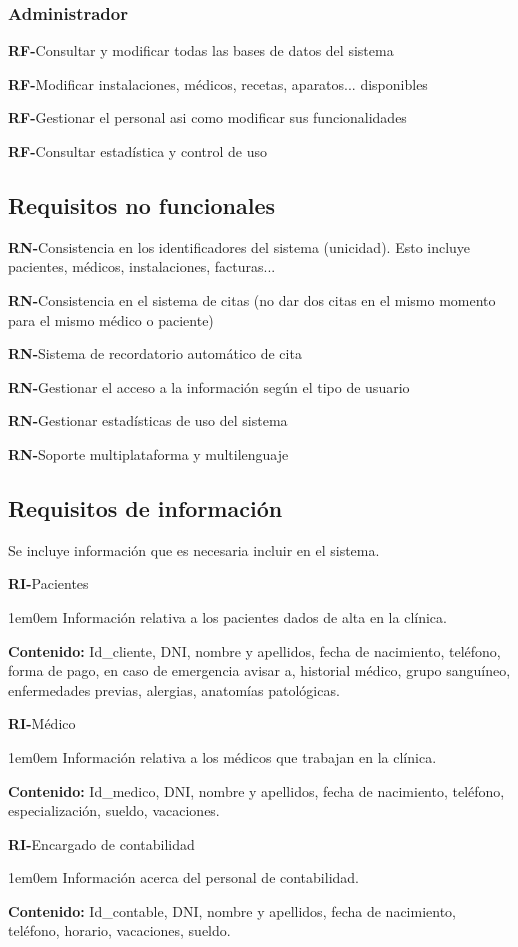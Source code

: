 \documentclass[12pt,a4paper]{article}
\newcounter{RFCounter}
\newcommand{\rf}[1]{\addtocounter{RFCounter}{1}\textbf{\rmfamily RF-\theRFCounter}\quad#1\\}
\newcounter{RNCounter}
\newcommand{\rn}[1]{\addtocounter{RNCounter}{1}\textbf{\rmfamily RN-\theRNCounter}\quad#1\\}
\newcounter{RICounter}
\newenvironment{rienv}[1]
	{\addtocounter{RICounter}{1}\textbf{\rmfamily RI-\theRICounter}\quad#1\begin{adjustwidth}{1em}{0em}}
	{\end{adjustwidth}}
\begin{document}
\subsubsection{Administrador}
    \rf{Consultar y modificar todas las bases de datos del sistema}
    \rf{Modificar instalaciones, médicos, recetas, aparatos... disponibles}
    \rf{Gestionar el personal asi como modificar sus funcionalidades}
    \rf{Consultar estadística y control de uso}

\subsection{Requisitos no funcionales}
  \rn{Consistencia en los identificadores del sistema (unicidad). Esto incluye pacientes, médicos, instalaciones, facturas...}
  \rn{Consistencia en el sistema de citas (no dar dos citas en el mismo momento para el mismo médico o paciente)}
  \rn{Sistema de recordatorio automático de cita}
  \rn{Gestionar el acceso a la información según el tipo de usuario}
  \rn{Gestionar estadísticas de uso del sistema}
  \rn{Soporte multiplataforma y multilenguaje}


\subsection{Requisitos de información}

Se incluye información que es necesaria incluir en el sistema.

\begin{rienv}{Pacientes}
  Información relativa a los pacientes dados de alta en la clínica.

  \textbf{Contenido:} Id\_cliente, DNI, nombre y apellidos, fecha de nacimiento, teléfono, forma de pago, en caso de emergencia avisar a, historial médico, grupo sanguíneo, enfermedades previas, alergias, anatomías patológicas.
\end{rienv}

\begin{rienv}{Médico}
	Información relativa a los médicos que trabajan en la clínica.

	\textbf{Contenido:} Id\_medico, DNI, nombre y apellidos, fecha de nacimiento, teléfono, especialización, sueldo, vacaciones.
\end{rienv}

\begin{rienv}{Encargado de contabilidad}
  Información acerca del personal de contabilidad.

  \textbf{Contenido:} Id\_contable, DNI, nombre y apellidos, fecha de nacimiento, teléfono, horario, vacaciones, sueldo.
\end{rienv}  
  
\end{document}
